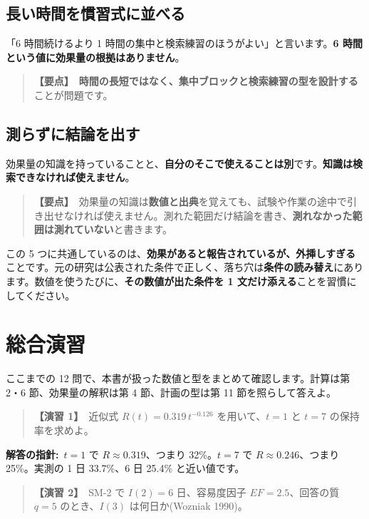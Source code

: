 \documentclass{article}
\begin{document}
\subsection{長い時間を慣習式に並べる}

「6 時間続けるより 1 時間の集中と検索練習のほうがよい」と言います。\textbf{6 時間という値に効果量の根拠はありません}。

\begin{quote}
\textbf{【要点】}\ \textbf{時間の長短ではなく、集中ブロックと検索練習の型を設計する}ことが問題です。
\end{quote}

\subsection{測らずに結論を出す}

効果量の知識を持っていることと、\textbf{自分のそこで使えることは別}です。\textbf{知識は検索できなければ使えません}。

\begin{quote}
\textbf{【要点】}\ 効果量の知識は\textbf{数値と出典}を覚えても、試験や作業の途中で引き出せなければ使えません。測れた範囲だけ結論を書き、\textbf{測れなかった範囲は測れていない}と書きます。
\end{quote}

この 5 つに共通しているのは、\textbf{効果があると報告されているが、外挿しすぎる}ことです。元の研究は公表された条件で正しく、落ち穴は\textbf{条件の読み替え}にあります。数値を使うたびに、\textbf{その数値が出た条件を 1 文だけ添える}ことを習慣にしてください。

\section{総合演習}

ここまでの 12 問で、本書が扱った数値と型をまとめて確認します。計算は第 2・6 節、効果量の解釈は第 4 節、計画の型は第 11 節を照らして答えよ。

\begin{quote}
\textbf{【演習 1】}\ 近似式 \(R(t) = 0.319\, t^{-0.126}\) を用いて、\(t = 1\) と \(t = 7\) の保持率を求めよ。
\end{quote}

\textbf{解答の指針:}\ \(t = 1\) で \(R \approx 0.319\)、つまり 32\%。\(t = 7\) で \(R \approx 0.246\)、つまり 25\%。実測の 1 日 33.7\%、6 日 25.4\% と近い値です。

\begin{quote}
\textbf{【演習 2】}\ SM-2 で \(I(2) = 6\) 日、容易度因子 \(EF = 2.5\)、回答の質 \(q = 5\) のとき、\(I(3)\) は何日か(Wozniak 1990)。
\end{quote}
\end{document}
